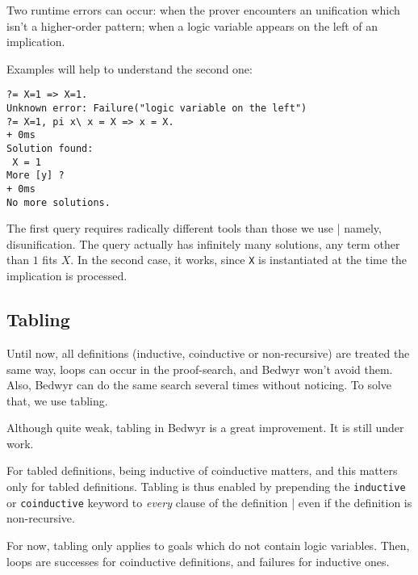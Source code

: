 \documentclass{article}
\begin{document}
Two runtime errors can occur:
when the prover encounters an unification which isn't a higher-order pattern;
when a logic variable appears on the left of an implication.

Examples will help to understand the second one:
\begin{verbatim}
?= X=1 => X=1.
Unknown error: Failure("logic variable on the left")
?= X=1, pi x\ x = X => x = X.
+ 0ms
Solution found:
 X = 1
More [y] ?
+ 0ms
No more solutions.
\end{verbatim}
The first query requires radically different tools than those we use |
namely, disunification. The query actually has infinitely many solutions,
any term other than $1$ fits $X$.
In the second case, it works, since \verb.X. is instantiated at the time the
implication is processed.

\subsection{Tabling}

Until now, all definitions (inductive, coinductive or non-recursive)
are treated the same way, loops can occur in the proof-search, and Bedwyr
won't avoid them. Also, Bedwyr can do the same search several times without
noticing. To solve that, we use tabling.

Although quite weak, tabling in Bedwyr is a great improvement.
It is still under work.

For tabled definitions, being inductive of coinductive matters, and this 
matters only for tabled definitions.
Tabling is thus enabled by prepending the \texttt{inductive} or
\texttt{coinductive} keyword to \emph{every} clause of the definition |
even if the definition is non-recursive.

For now, tabling only applies to goals which do not contain logic variables.
Then, loops are successes for coinductive definitions,
and failures for inductive ones.
\end{document}
